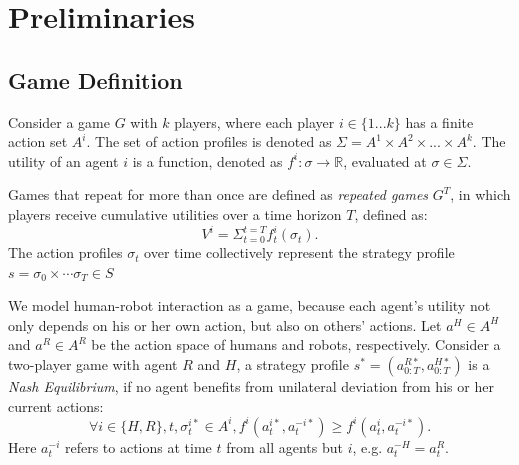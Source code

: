 \documentclass[letterpaper, 10 pt, conference]{ieeeconf}  %
\begin{document}




\section{Preliminaries}
\subsection{Game Definition}
Consider a game $G$ with $k$ players, where each player $i \in \{1...k\}$ has 
a finite action set $A^i$. The set of action profiles is denoted as 
$\Sigma = A^1 \times A^2 \times ... \times A^k$. The utility of an 
agent $i$ is a function, denoted as $f^i: \sigma \rightarrow \mathbb{R} $, 
evaluated at $\sigma \in \Sigma$. 

Games that repeat for more than once are defined as 
\textit{repeated games} $G^T$, in which players receive cumulative utilities over a 
time horizon $T$, defined as:
\begin{equation}
  V^i=\Sigma_{t=0}^{t=T} f^i_t(\sigma_t).
\end{equation}
The action profiles $\sigma_t$ over time collectively represent the 
strategy profile $s = \sigma_0 \times \cdots \sigma_T \in S$ 

We model human-robot interaction as a game, because each agent's utility not 
only depends on his or her own action, but also on others' actions. Let 
$a^H \in A^H$ and $a^R \in A^R$ be the action space of humans and robots, 
respectively. Consider a two-player game with agent $R$ and $H$, a strategy profile $s^* = (a^{R*}_{0:T},a^{H*}_{0:T})$ is a \textit{Nash Equilibrium}, if no 
agent benefits from unilateral deviation from his or her current actions:
\begin{equation}
  \forall i \in \{H,R\}, t,\sigma^{i*}_t \in A^i, f^i(a^{i*}_t,a^{-i*}_t) \geq f^i(a^{i}_t,a^{-i*}_t). 
\end{equation}
Here $a^{-i}_t$ refers to actions at time $t$ from all agents but $i$, e.g. $a_t^{-H} = a_t^R$. 
\end{document}
